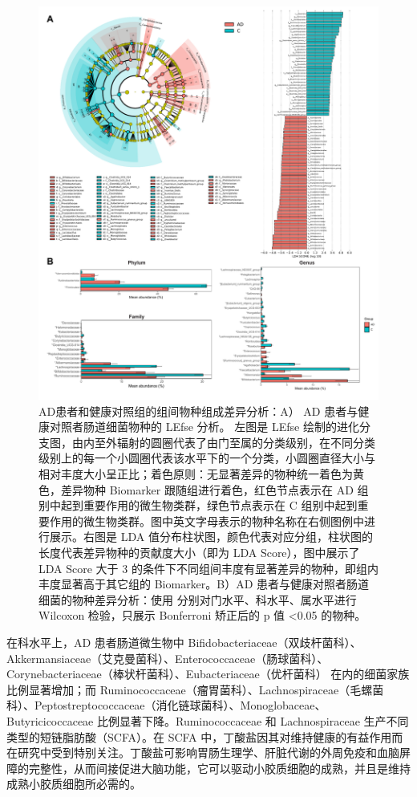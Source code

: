 \documentclass[supercite]{HustGraduPaper}
\begin{document}
\begin{figure}[htbp]
	\includegraphics[width=\textwidth]{plot/difference analy.pdf}
	\caption{AD患者和健康对照组的组间物种组成差异分析：A） AD 患者与健康对照者肠道细菌物种的 LEfse 分析。 左图是 LEfse 绘制的进化分支图，由内至外辐射的圆圈代表了由门至属的分类级别，在不同分类级别上的每一个小圆圈代表该水平下的一个分类，小圆圈直径大小与相对丰度大小呈正比；着色原则：无显著差异的物种统一着色为黄色，差异物种 Biomarker 跟随组进行着色，红色节点表示在 AD 组别中起到重要作用的微生物类群，绿色节点表示在 C 组别中起到重要作用的微生物类群。图中英文字母表示的物种名称在右侧图例中进行展示。右图是 LDA 值分布柱状图，颜色代表对应分组，柱状图的长度代表差异物种的贡献度大小（即为 LDA Score），图中展示了 LDA Score 大于 3 的条件下不同组间丰度有显著差异的物种，即组内丰度显著高于其它组的 Biomarker。B）AD 患者与健康对照者肠道细菌的物种差异分析：使用 分别对门水平、科水平、属水平进行 Wilcoxon 检验，只展示 Bonferroni 矫正后的 p 值 <0.05 的物种。}
	\label{fig:diff}
\end{figure}


在科水平上，AD 患者肠道微生物中 Bifidobacteriaceae（双歧杆菌科）、Akkermansiaceae（艾克曼菌科）、Enterococcaceae（肠球菌科）、Corynebacteriaceae（棒状杆菌科）、Eubacteriaceae（优杆菌科） 在内的细菌家族比例显著增加；而 Ruminococcaceae（瘤胃菌科）、Lachnospiraceae（毛螺菌科）、Peptostreptococcaceae（消化链球菌科）、Monoglobaceae、Butyricicoccaceae 比例显著下降。Ruminococcaceae 和 Lachnospiraceae 生产不同类型的短链脂肪酸（SCFA）。在 SCFA 中，丁酸盐因其对维持健康的有益作用而在研究中受到特别关注。丁酸盐可影响胃肠生理学、肝脏代谢的外周免疫和血脑屏障的完整性，从而间接促进大脑功能，它可以驱动小胶质细胞的成熟，并且是维持成熟小胶质细胞所必需的\cite{fung2017interactions}。
\end{document}
